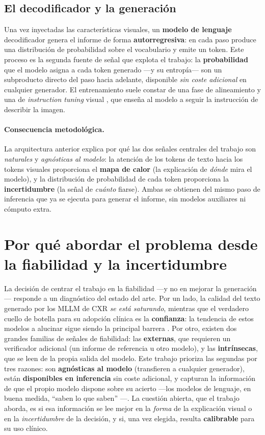 \subsection{El decodificador y la generación}
Una vez inyectadas las características visuales, un \textbf{modelo de lenguaje} decodificador genera el
informe de forma \textbf{autorregresiva}: en cada paso produce una distribución de probabilidad sobre
el vocabulario y emite un token. Este proceso es la segunda fuente de señal que explota el trabajo: la
\textbf{probabilidad} que el modelo asigna a cada token generado —y su entropía— son un subproducto
directo del paso hacia adelante, disponible \emph{sin coste adicional} en cualquier generador. El
entrenamiento suele constar de una fase de alineamiento y una de \textit{instruction tuning} visual
\parencite{liu2023llava}, que enseña al modelo a seguir la instrucción de describir la imagen.

\paragraph{Consecuencia metodológica.} La arquitectura anterior explica por qué las dos señales
centrales del trabajo son \emph{naturales} y \emph{agnósticas al modelo}: la atención de los tokens de
texto hacia los tokens visuales proporciona el \textbf{mapa de calor} (la explicación de \emph{dónde}
mira el modelo), y la distribución de probabilidad de cada token proporciona la \textbf{incertidumbre}
(la señal de \emph{cuánto} fiarse). Ambas se obtienen del mismo paso de inferencia que ya se ejecuta
para generar el informe, sin modelos auxiliares ni cómputo extra.

\section{Por qué abordar el problema desde la fiabilidad y la incertidumbre}
La decisión de centrar el trabajo en la fiabilidad —y no en mejorar la generación— responde a un
diagnóstico del estado del arte. Por un lado, la calidad del texto generado por los MLLM de CXR
\emph{se está saturando}, mientras que el verdadero cuello de botella para su adopción clínica es la
\textbf{confianza}: la tendencia de estos modelos a alucinar sigue siendo la principal barrera
\parencite{ji2023}. Por otro, existen dos grandes familias de señales de fiabilidad: las
\textbf{externas}, que requieren un verificador adicional (un informe de referencia u otro modelo), y
las \textbf{intrínsecas}, que se leen de la propia salida del modelo. Este trabajo prioriza las
segundas por tres razones: son \textbf{agnósticas al modelo} (transfieren a cualquier generador), están
\textbf{disponibles en inferencia} sin coste adicional, y capturan la información de que el propio
modelo dispone sobre su acierto —los modelos de lenguaje, en buena medida, ``saben lo que saben''
\parencite{kadavath2022}—. La cuestión abierta, que el trabajo aborda, es si esa información se lee
mejor en la \emph{forma} de la explicación visual o en la \emph{incertidumbre} de la decisión, y si,
una vez elegida, resulta \textbf{calibrable} \parencite{guo2017} para su uso clínico.

